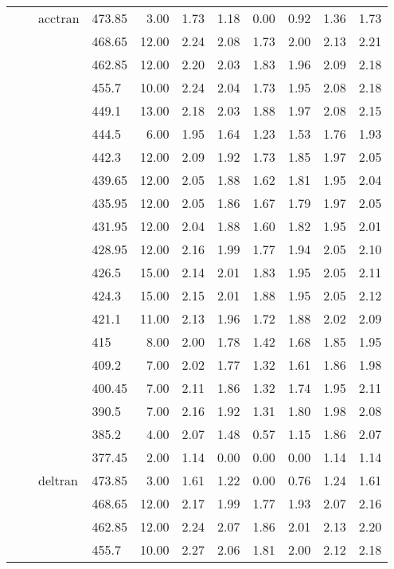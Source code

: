 \begin{longtable}{llllrrrrrrr}
   &  & acctran & 473.85 & 3.00 & 1.73 & 1.18 & 0.00 & 0.92 & 1.36 & 1.73 \\ 
   &  &  & 468.65 & 12.00 & 2.24 & 2.08 & 1.73 & 2.00 & 2.13 & 2.21 \\ 
   &  &  & 462.85 & 12.00 & 2.20 & 2.03 & 1.83 & 1.96 & 2.09 & 2.18 \\ 
   &  &  & 455.7 & 10.00 & 2.24 & 2.04 & 1.73 & 1.95 & 2.08 & 2.18 \\ 
   &  &  & 449.1 & 13.00 & 2.18 & 2.03 & 1.88 & 1.97 & 2.08 & 2.15 \\ 
   &  &  & 444.5 & 6.00 & 1.95 & 1.64 & 1.23 & 1.53 & 1.76 & 1.93 \\ 
   &  &  & 442.3 & 12.00 & 2.09 & 1.92 & 1.73 & 1.85 & 1.97 & 2.05 \\ 
   &  &  & 439.65 & 12.00 & 2.05 & 1.88 & 1.62 & 1.81 & 1.95 & 2.04 \\ 
   &  &  & 435.95 & 12.00 & 2.05 & 1.86 & 1.67 & 1.79 & 1.97 & 2.05 \\ 
   &  &  & 431.95 & 12.00 & 2.04 & 1.88 & 1.60 & 1.82 & 1.95 & 2.01 \\ 
   &  &  & 428.95 & 12.00 & 2.16 & 1.99 & 1.77 & 1.94 & 2.05 & 2.10 \\ 
   &  &  & 426.5 & 15.00 & 2.14 & 2.01 & 1.83 & 1.95 & 2.05 & 2.11 \\ 
   &  &  & 424.3 & 15.00 & 2.15 & 2.01 & 1.88 & 1.95 & 2.05 & 2.12 \\ 
   &  &  & 421.1 & 11.00 & 2.13 & 1.96 & 1.72 & 1.88 & 2.02 & 2.09 \\ 
   &  &  & 415 & 8.00 & 2.00 & 1.78 & 1.42 & 1.68 & 1.85 & 1.95 \\ 
   &  &  & 409.2 & 7.00 & 2.02 & 1.77 & 1.32 & 1.61 & 1.86 & 1.98 \\ 
   &  &  & 400.45 & 7.00 & 2.11 & 1.86 & 1.32 & 1.74 & 1.95 & 2.11 \\ 
   &  &  & 390.5 & 7.00 & 2.16 & 1.92 & 1.31 & 1.80 & 1.98 & 2.08 \\ 
   &  &  & 385.2 & 4.00 & 2.07 & 1.48 & 0.57 & 1.15 & 1.86 & 2.07 \\ 
   &  &  & 377.45 & 2.00 & 1.14 & 0.00 & 0.00 & 0.00 & 1.14 & 1.14 \\ 
   &  & deltran & 473.85 & 3.00 & 1.61 & 1.22 & 0.00 & 0.76 & 1.24 & 1.61 \\ 
   &  &  & 468.65 & 12.00 & 2.17 & 1.99 & 1.77 & 1.93 & 2.07 & 2.16 \\ 
   &  &  & 462.85 & 12.00 & 2.24 & 2.07 & 1.86 & 2.01 & 2.13 & 2.20 \\ 
   &  &  & 455.7 & 10.00 & 2.27 & 2.06 & 1.81 & 2.00 & 2.12 & 2.18 \\ 

\end{longtable}
